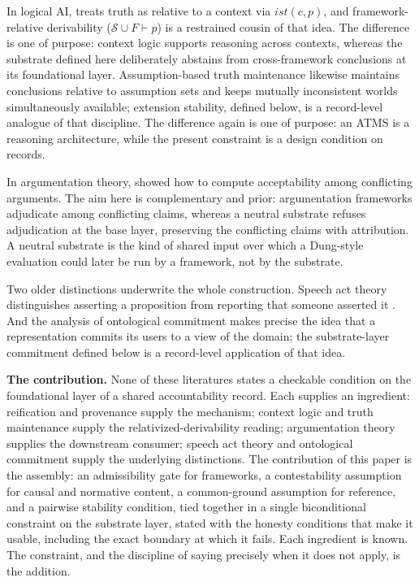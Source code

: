 \documentclass[11pt]{article}
\theoremstyle{plain}
\theoremstyle{definition}
\theoremstyle{remark}
\newcommand{\Substrate}{\mathcal{S}}
\newcommand{\Framework}{F}
\newcommand{\entails}{\vdash}
\begin{document}
In logical AI, \citet{mccarthy1993} treats truth as relative to a context via
$\mathit{ist}(c,p)$,
and framework-relative derivability
($\Substrate \cup \Framework \entails p$)
is a restrained cousin of that idea.
The difference is one of purpose:
context logic supports reasoning across contexts,
whereas the substrate defined here deliberately abstains from
cross-framework conclusions at its foundational layer.
Assumption-based truth maintenance \citep{dekleer1986atms}
likewise maintains conclusions relative to
assumption sets and keeps mutually inconsistent worlds simultaneously
available;
extension stability, defined below,
is a record-level analogue of that discipline.
The difference again is one of purpose:
an ATMS is a reasoning architecture,
while the present constraint is a design condition on records.

In argumentation theory, \citet{dung1995} showed how to compute acceptability
among conflicting arguments.
The aim here is complementary and prior:
argumentation frameworks adjudicate among conflicting claims,
whereas a neutral substrate refuses adjudication at the base layer,
preserving the conflicting claims with attribution.
A neutral substrate is the kind of shared input over
which a Dung-style evaluation could later be run by a framework, not by the
substrate.

Two older distinctions underwrite the whole construction.
Speech act theory distinguishes asserting a proposition
from reporting that someone asserted it
\citep{searle1969}.
And the analysis of ontological commitment\citep{guarino1998}
makes precise the idea that a representation commits its
users to a view of the domain;
the substrate-layer commitment defined below is
a record-level application of that idea.

\textbf{The contribution.}
None of these literatures states a checkable
condition on the foundational layer of a shared accountability record.
Each supplies an ingredient:
reification and provenance supply the mechanism;
context logic and truth maintenance supply the relativized-derivability
reading;
argumentation theory supplies the downstream consumer;
speech act theory and ontological commitment supply the underlying distinctions.
The contribution of this paper is the assembly:
an admissibility gate for frameworks,
a contestability assumption for causal and normative content,
a common-ground assumption for reference, and
a pairwise stability condition,
tied together in a single biconditional constraint on the substrate layer,
stated with the honesty conditions that make it usable,
including the exact boundary at which it fails.
Each ingredient is known.
The constraint, and the discipline of saying precisely
when it does not apply, is the addition.
\end{document}
